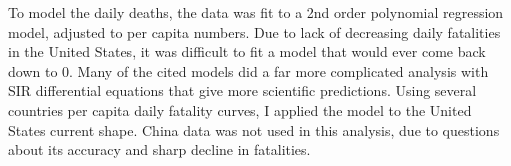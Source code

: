 To model the daily deaths, the data was fit to a 2nd order polynomial regression model, adjusted to per capita numbers.  Due to lack of decreasing daily fatalities in the United States, it was difficult to fit a model that would ever come back down to 0.  Many of the cited models did a far more complicated analysis with SIR differential equations that give more scientific predictions.  Using several countries per capita daily fatality curves, I applied the model to the United States current shape. China data was not used in this analysis, due to questions about its accuracy and sharp decline in fatalities. 
